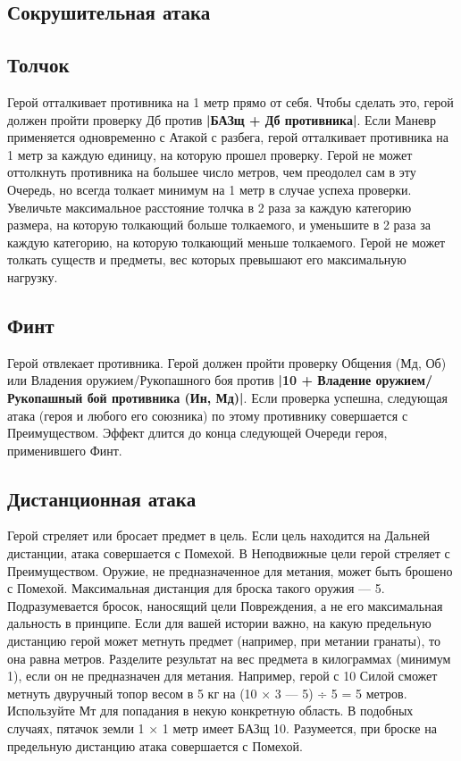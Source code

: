 \subsection{Сокрушительная атака}
\subsection{Толчок}
Герой отталкивает противника на 1 метр прямо от себя. Чтобы сделать это, герой должен пройти проверку Дб против \textbf{|БАЗщ + Дб противника|}.
\newline
Если Маневр применяется одновременно с Атакой с разбега, герой отталкивает противника на 1 метр за каждую единицу, на которую прошел проверку. Герой не может оттолкнуть противника на большее число метров, чем преодолел сам в эту Очередь, но всегда толкает минимум на 1 метр в случае успеха проверки.
Увеличьте максимальное расстояние толчка в 2 раза за каждую категорию размера, на которую толкающий больше толкаемого, и уменьшите в 2 раза за каждую категорию, на которую толкающий меньше толкаемого.
\newline
Герой не может толкать существ и предметы, вес которых превышают его максимальную нагрузку.
\subsection{Финт}
Герой отвлекает противника. Герой должен пройти проверку Общения (Мд, Об) или Владения оружием/Рукопашного боя против \textbf{|10 + Владение оружием/Рукопашный бой противника (Ин, Мд)|}. Если проверка успешна, следующая атака (героя и любого его союзника) по этому противнику совершается с Преимуществом. Эффект длится до конца следующей Очереди героя, применившего Финт.
\subsection{Дистанционная атака}
Герой стреляет или бросает предмет в цель. Если цель находится на Дальней дистанции, атака совершается с Помехой. В Неподвижные цели герой стреляет с Преимуществом.
\newline
Оружие, не предназначенное для метания, может быть брошено с Помехой. Максимальная дистанция для броска такого оружия — 5. Подразумевается бросок, наносящий цели Повреждения, а не его максимальная дальность в принципе.
\newline
Если для вашей истории важно, на какую предельную дистанцию герой может метнуть предмет (например, при метании гранаты), то она равна  метров. Разделите результат на вес предмета в килограммах (минимум 1), если он не предназначен для метания. Например, герой с 10 Силой сможет метнуть двуручный топор весом в 5 кг на (10 × 3 — 5) ÷ 5 = 5 метров. Используйте Мт для попадания в некую конкретную область. В подобных случаях, пятачок земли 1 × 1 метр имеет БАЗщ 10. Разумеется, при броске на предельную дистанцию атака совершается с Помехой.
